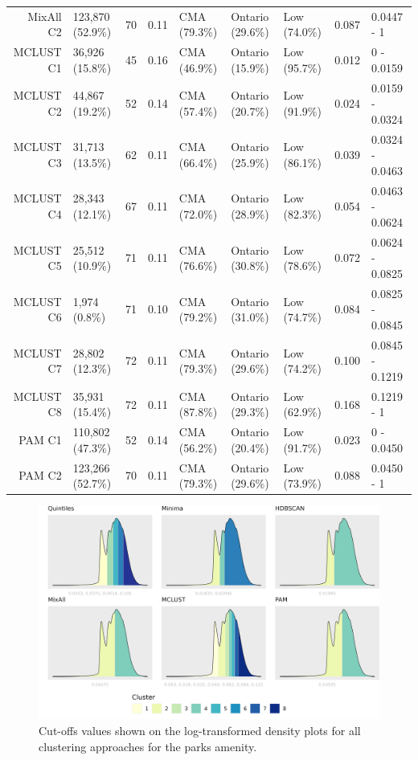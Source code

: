 \documentclass[11pt, a4paper]{article}
\begin{document}
\begin{table}[H]
{\begin{tabular}{|r|llllllll|}
  MixAll C2 & 123,870 (52.9\%) & 70 & 0.11 & CMA (79.3\%) & Ontario (29.6\%) & Low (74.0\%) & 0.087 & 0.0447 - 1 \\
\rowcolor{gray!25}  MCLUST C1 & 36,926 (15.8\%) & 45 & 0.16 & CMA (46.9\%) & Ontario (15.9\%) & Low (95.7\%) & 0.012 & 0 - 0.0159 \\
 \rowcolor{gray!25} MCLUST C2 & 44,867 (19.2\%) & 52 & 0.14 & CMA (57.4\%) & Ontario (20.7\%) & Low (91.9\%) & 0.024 & 0.0159 - 0.0324 \\
\rowcolor{gray!25}  MCLUST C3 & 31,713 (13.5\%) & 62 & 0.11 & CMA (66.4\%) & Ontario (25.9\%) & Low (86.1\%) & 0.039 & 0.0324 - 0.0463 \\
 \rowcolor{gray!25} MCLUST C4 & 28,343 (12.1\%) & 67 & 0.11 & CMA (72.0\%) & Ontario (28.9\%) & Low (82.3\%) & 0.054 & 0.0463 - 0.0624 \\
 \rowcolor{gray!25} MCLUST C5 & 25,512 (10.9\%) & 71 & 0.11 & CMA (76.6\%) & Ontario (30.8\%) & Low (78.6\%) & 0.072 & 0.0624 - 0.0825 \\
 \rowcolor{gray!25} MCLUST C6 & 1,974 (0.8\%) & 71 & 0.10 & CMA (79.2\%) & Ontario (31.0\%) & Low (74.7\%) & 0.084 & 0.0825 - 0.0845 \\
 \rowcolor{gray!25} MCLUST C7 & 28,802 (12.3\%) & 72 & 0.11 & CMA (79.3\%) & Ontario (29.6\%) & Low (74.2\%) & 0.100 & 0.0845 - 0.1219 \\
\rowcolor{gray!25}  MCLUST C8 & 35,931 (15.4\%) & 72 & 0.11 & CMA (87.8\%) & Ontario (29.3\%) & Low (62.9\%) & 0.168 & 0.1219 - 1 \\
  PAM C1 & 110,802 (47.3\%) & 52 & 0.14 & CMA (56.2\%) & Ontario (20.4\%) & Low (91.7\%) & 0.023 & 0 - 0.0450 \\
  PAM C2 & 123,266 (52.7\%) & 70 & 0.11 & CMA (79.3\%) & Ontario (29.6\%) & Low (73.9\%) & 0.088 & 0.0450 - 1 \\
   \hline
\end{tabular}
}
\end{table}






\begin{figure}[H]
\centering
\includegraphics[width=\textwidth]{./cutoffs/by_amenity/Parks_cutoffs.png}
\caption[Parks cutoffs]{Cut-offs values shown on the log-transformed density plots for all clustering approaches for the parks amenity.}\label{parkscutoffs}
\end{figure}
\end{document}
